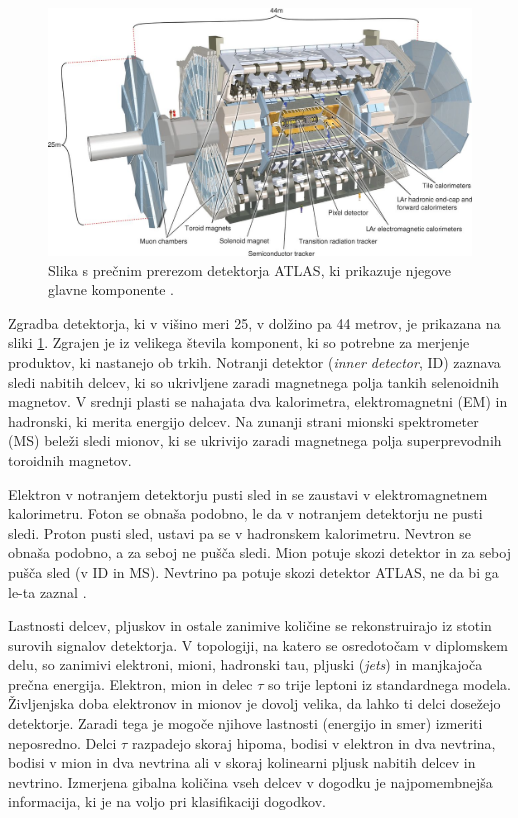 \documentclass[11pt,a4paper,openany]{book}
\begin{document}
\begin{figure}[ht]
	\includegraphics[width=16.0cm]{physics/atlas_detector.jpg}
	
	\caption{Slika s prečnim prerezom detektorja ATLAS, ki prikazuje njegove glavne komponente \cite{AadScience2012}.  }
	\label{detektoratlas}
\end{figure}

Zgradba detektorja, ki v višino meri 25, v dolžino pa 44 metrov, je prikazana na sliki \ref{detektoratlas}. Zgrajen je iz velikega števila komponent, ki so potrebne za merjenje produktov, ki nastanejo ob trkih. Notranji detektor (\textit{inner detector}, ID) zaznava sledi nabitih delcev, ki so ukrivljene zaradi magnetnega polja tankih selenoidnih magnetov. V srednji plasti se nahajata dva kalorimetra, elektromagnetni (EM) in hadronski, ki merita energijo delcev. Na zunanji strani mionski spektrometer (MS) beleži sledi mionov, ki se ukrivijo zaradi magnetnega polja superprevodnih toroidnih magnetov.

Elektron v notranjem detektorju pusti sled in se zaustavi v elektromagnetnem kalorimetru. Foton se obnaša podobno, le da v notranjem detektorju ne pusti sledi. Proton pusti sled, ustavi pa se v hadronskem kalorimetru. Nevtron se obnaša podobno, a za seboj ne pušča sledi. Mion potuje skozi detektor in za seboj pušča sled (v ID in MS). Nevtrino pa potuje skozi detektor ATLAS, ne da bi ga le-ta zaznal \cite{CerknLHCParticles}.

Lastnosti delcev, pljuskov in ostale zanimive količine se rekonstruirajo iz stotin surovih signalov detektorja. V topologiji, na katero se osredotočam v diplomskem delu, so zanimivi elektroni, mioni, hadronski tau, pljuski (\textit{jets}) in manjkajoča prečna energija. Elektron, mion in delec $\tau$ so trije leptoni iz standardnega modela. Življenjska doba elektronov in mionov je dovolj velika, da lahko ti delci dosežejo detektorje. Zaradi tega je mogoče njihove lastnosti (energijo in smer) izmeriti neposredno. Delci $\tau$ razpadejo skoraj hipoma, bodisi v elektron in dva nevtrina, bodisi v mion in dva nevtrina ali v skoraj kolinearni pljusk nabitih delcev in nevtrino. Izmerjena gibalna količina vseh delcev v dogodku je najpomembnejša informacija, ki je na voljo pri klasifikaciji dogodkov.
\end{document}
